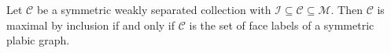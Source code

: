 \begin{theo}
\label{main}
Let $\mathcal{C}$ be a symmetric weakly separated collection with $\mathcal{I} \subseteq \mathcal{C} \subseteq \mathcal{M}$. Then $\mathcal{C}$ is maximal by inclusion if and only if $\mathcal{C}$ is the set of face labels of a symmetric plabic graph. 
\end{theo}
